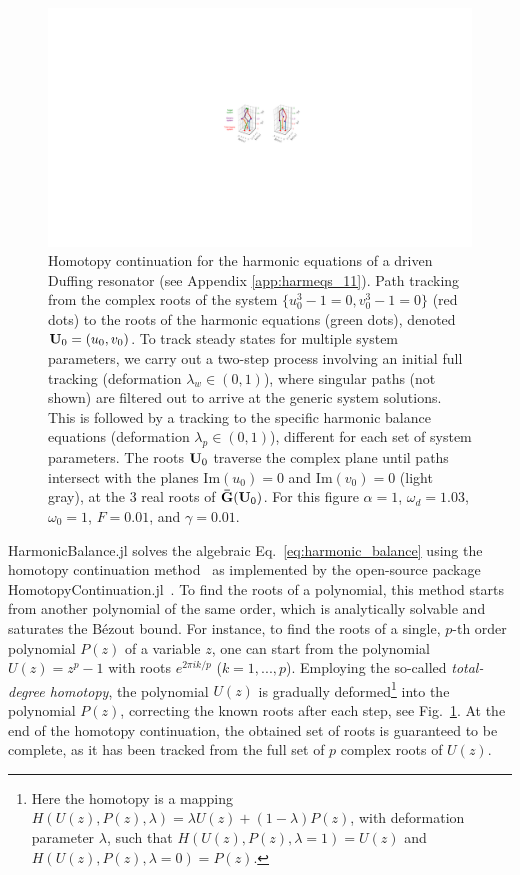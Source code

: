 \begin{figure}[t]
	\centering
	\includegraphics[width=\textwidth]{figures/hb/hb_paths.pdf}
	\caption{Homotopy continuation for the harmonic equations of a driven Duffing resonator (see Appendix \ref{app:harmeqs_11}). Path tracking from the complex roots of the system $\{u_0^3-1=0,v_0^3-1=0\}$ (red dots) to the roots of the harmonic equations (green dots), denoted $\vb{U}_0=(u_0,v_0)$.  To track steady states for multiple system parameters, we carry out a two-step process involving an initial full tracking (deformation $\lambda_w\in(0,1)$), where singular paths (not shown) are filtered out to arrive at the generic system solutions. This is followed by a tracking to the specific harmonic balance equations (deformation $\lambda_p\in(0,1)$), different for each set of system parameters.  The roots $\vb{U}_0$ traverse the complex plane until paths intersect with the planes $\mathrm{Im}(u_0)=0$ and $\mathrm{Im}(v_0)=0$ (light gray), at the 3 real roots of $\vb{\bar{G}}(\vb{U}_0)$. For this figure $\alpha=1$, $\omega_d=1.03$, $\omega_0=1$, $F=0.01$, and $\gamma=0.01$.}
	\label{fig:path_track}
\end{figure} 

HarmonicBalance.jl solves the algebraic Eq.~\eqref{eq:harmonic_balance} using the homotopy continuation method~\cite{Bates_2013, Verschelde_1999} as implemented by the open-source package HomotopyContinuation.jl~\cite{Breiding_2018}. To find the roots of a polynomial, this method starts from another polynomial of the same order, which is analytically solvable and saturates the Bézout bound. For instance, to find the roots of a single, $p$-th order polynomial $P(z)$ of a variable $z$, one can start from the polynomial $U(z)=z^p - 1$ with roots $e^{2\pi i k /p}$ ($k = 1,..., p$). Employing the so-called \textit{total-degree homotopy}, the polynomial $U(z)$ is gradually deformed\footnote{Here the homotopy is a mapping $H(U(z),P(z),\lambda)=\lambda U(z)+(1-\lambda)P(z)$, with deformation parameter $\lambda$, such that $H(U(z),P(z),\lambda=1)=U(z)$ and $H(U(z),P(z),\lambda=0)=P(z)$.} into the polynomial $P(z)$, correcting the known roots after each step, see Fig.~\ref{fig:path_track}. At the end of the homotopy continuation, the obtained set of roots is guaranteed to be complete, as it has been tracked from the full set of $p$ complex roots of $U(z)$.

